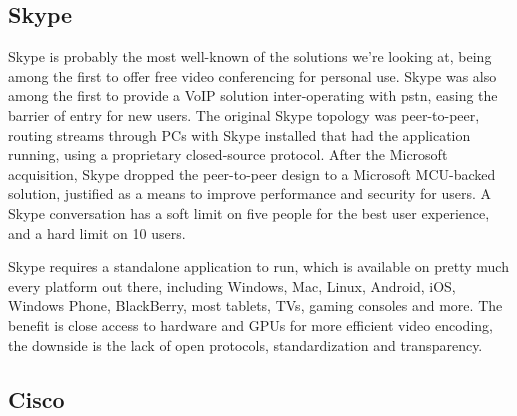 \subsection{Skype}

Skype is probably the most well-known of the solutions we're looking at, being among the first to offer free video conferencing for personal use. Skype was also among the first to provide a VoIP solution inter-operating with \gls{pstn}, easing the barrier of entry for new users. The original Skype topology was peer-to-peer, routing streams through PCs with Skype installed that had the application running, using a proprietary closed-source protocol. After the Microsoft acquisition, Skype dropped the peer-to-peer design to a Microsoft MCU-backed solution, justified as a means to improve performance and security for users. A Skype conversation has a soft limit on five people for the best user experience, and a hard limit on 10 users.

Skype requires a standalone application to run, which is available on pretty much every platform out there, including Windows, Mac, Linux, Android, iOS, Windows Phone, BlackBerry, most tablets, TVs, gaming consoles and more. The benefit is close access to hardware and GPUs for more efficient video encoding, the downside is the lack of open protocols, standardization and transparency.


\subsection{Cisco}

